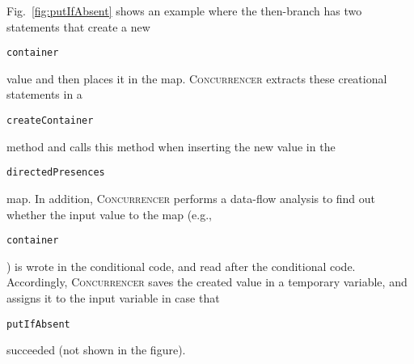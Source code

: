 \documentclass[10pt,preprint]{sigplanconf}
\newcommand\tool{{\smaller\textsc{Concurrencer}}\xspace}
\newenvironment{CodeOut}{\begin{scriptsize}}{\end{scriptsize}}
\newcommand{\code}[1]{\begin{small}\texttt{#1}\end{small}}
\newcommand{\MaxWidth}{\columnwidth}
\begin{document}
Fig.~\ref{fig:putIfAbsent} shows an example where
the then-branch has two statements that create a new \code{container} value and
then places it in the map. \tool extracts these creational statements in a
\code{createContainer} method and calls this method when inserting the new value
in the \code{directedPresences} map. In addition, \tool performs a data-flow
analysis to find out whether the input value to the map
(e.g., \code{container}) is wrote in the conditional code, and read after the
conditional code. Accordingly, \tool saves the created value in a temporary
variable, and assigns it to the input variable in case that 
\code{putIfAbsent} succeeded (not shown in the figure).








% 
%  
%   
% 
% 
% 
%  
%  
\end{document}

